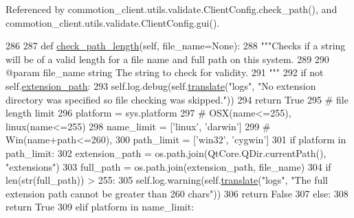 Referenced by commotion\-\_\-client.\-utils.\-validate.\-Client\-Config.\-check\-\_\-path(), and commotion\-\_\-client.\-utils.\-validate.\-Client\-Config.\-gui().


\begin{DoxyCode}
286 
287     \textcolor{keyword}{def }\hyperlink{classcommotion__client_1_1utils_1_1validate_1_1ClientConfig_af89fc4407c4af2d96ad0146b1249a272}{check\_path\_length}(self, file\_name=None):
288         \textcolor{stringliteral}{"""Checks if a string will be of a valid length for a file name and full path on this system.}
289 \textcolor{stringliteral}{}
290 \textcolor{stringliteral}{        @param file\_name string The string to check for validity.}
291 \textcolor{stringliteral}{        """}
292         \textcolor{keywordflow}{if} \textcolor{keywordflow}{not} self.\hyperlink{classcommotion__client_1_1utils_1_1validate_1_1ClientConfig_a422e4fea49a7e582749c0e0c6d11e2d9}{extension\_path}:
293             self.log.debug(self.\hyperlink{classcommotion__client_1_1utils_1_1validate_1_1ClientConfig_a12d19377a853ce92cc0e0d758acdd804}{translate}(\textcolor{stringliteral}{"logs"}, \textcolor{stringliteral}{"No extension directory was specified so file
       checking was skipped."}))
294             \textcolor{keywordflow}{return} \textcolor{keyword}{True}
295         \textcolor{comment}{# file length limit}
296         platform = sys.platform
297         \textcolor{comment}{# OSX(name<=255),  linux(name<=255)}
298         name\_limit = [\textcolor{stringliteral}{'linux'}, \textcolor{stringliteral}{'darwin'}]
299         \textcolor{comment}{# Win(name+path<=260),}
300         path\_limit = [\textcolor{stringliteral}{'win32'}, \textcolor{stringliteral}{'cygwin'}]
301         \textcolor{keywordflow}{if} platform \textcolor{keywordflow}{in} path\_limit:
302             extension\_path = os.path.join(QtCore.QDir.currentPath(), \textcolor{stringliteral}{"extensions"})
303             full\_path = os.path.join(extension\_path, file\_name)
304             \textcolor{keywordflow}{if} len(str(full\_path)) > 255:
305                 self.log.warning(self.\hyperlink{classcommotion__client_1_1utils_1_1validate_1_1ClientConfig_a12d19377a853ce92cc0e0d758acdd804}{translate}(\textcolor{stringliteral}{"logs"}, \textcolor{stringliteral}{"The full extension path cannot be greater
       than 260 chars"}))
306                 \textcolor{keywordflow}{return} \textcolor{keyword}{False}
307             \textcolor{keywordflow}{else}:
308                 \textcolor{keywordflow}{return} \textcolor{keyword}{True}
309         \textcolor{keywordflow}{elif} platform \textcolor{keywordflow}{in} name\_limit:

\end{DoxyCode}
